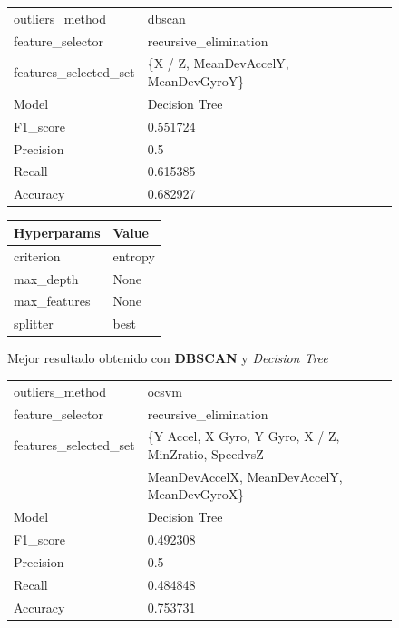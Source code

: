 \begin{appendices}
		\begin{figure}[htb]
			\centering
			\begin{tabular}{ll}
				\toprule
					  outliers\_method &                               dbscan \\
					 feature\_selector &                recursive\_elimination \\
				features\_selected\_set & \{X / Z, MeanDevAccelY, MeanDevGyroY\} \\
								Model &                        Decision Tree \\
						F1\_score &                             0.551724 \\
					   Precision &                                  0.5 \\
						  Recall &                             0.615385 \\
						Accuracy &                             0.682927 \\
				\bottomrule
			\end{tabular}
			\newline
			\newline

			\begin{tabular}{ll}
				\toprule
				 Hyperparams &   Value \\
				\midrule
				   criterion & entropy \\
				   max\_depth &    None \\
				max\_features &    None \\
					splitter &    best \\
				\bottomrule
			\end{tabular}
			\caption{Mejor resultado obtenido con \textbf{DBSCAN} y \emph{Decision Tree}}
			\label{table:23}
		\end{figure}

		\begin{figure}[htb]
			\centering
			\begin{tabular}{ll}
				\toprule
					  outliers\_method &                                              ocsvm \\
					 feature\_selector &                              recursive\_elimination \\
				features\_selected\_set & \{Y Accel, X Gyro, Y Gyro, X / Z, MinZratio, SpeedvsZ \\
									{} & MeanDevAccelX, MeanDevAccelY, MeanDevGyroX\} \\
								Model &                                      Decision Tree \\
						F1\_score &                                           0.492308 \\
					   Precision &                                                0.5 \\
						  Recall &                                           0.484848 \\
						Accuracy &                                           0.753731 \\
				\bottomrule
			\end{tabular}
			\newline
			\newline


\end{figure}
\end{appendices}
